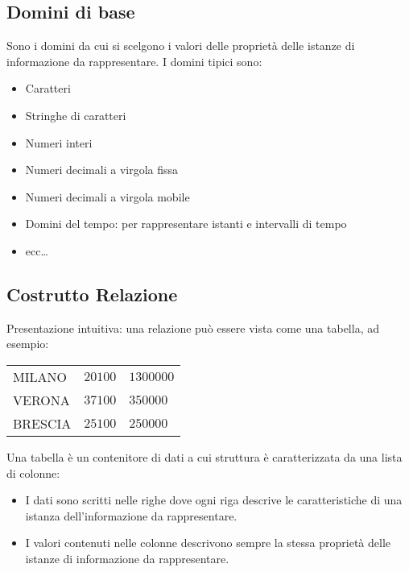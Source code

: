 \documentclass[a4paper, 10pt]{article}
\theoremstyle{definition}
\begin{document}
	\subsection{Domini di base}
		Sono i domini da cui si scelgono i valori delle proprietà delle istanze di informazione da rappresentare. I domini tipici sono:
		\begin{itemize}
			\item Caratteri
			\item Stringhe di caratteri
			\item Numeri interi
			\item Numeri decimali a virgola fissa
			\item Numeri decimali a virgola mobile
			\item Domini del tempo: per rappresentare istanti e intervalli di tempo
			\item ecc\dots
		\end{itemize}
		
	\subsection{Costrutto Relazione}
		Presentazione intuitiva: una relazione può essere vista come una tabella, ad esempio:
		
		\bigskip
		
		\begin{tabular}{lll}
			\toprule
			MILANO  & $20100$ & $1300000$ \\
			VERONA  & $37100$ & $350000$ \\
			BRESCIA & $25100$ & $250000$\\
		\end{tabular}
		
		Una tabella è un contenitore di dati a cui struttura è caratterizzata da una lista di colonne:
		\begin{itemize}
			\item I dati sono scritti nelle righe dove ogni riga descrive le caratteristiche di una istanza dell'informazione da rappresentare.
			\item I valori contenuti nelle colonne descrivono sempre la stessa proprietà delle istanze di informazione da rappresentare.
		\end{itemize}
		
\end{document}
